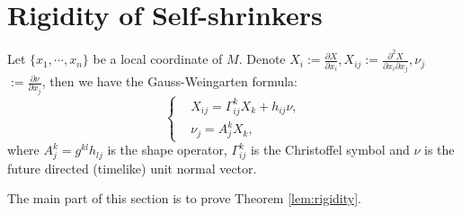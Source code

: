 \documentclass[10pt,a4paper]{amsart}
\newcommand{\pd}[2]{\frac{\partial {#1}}{\partial {#2}}}
\numberwithin{equation}{section}
\begin{document}
\section{Rigidity of Self-shrinkers}\label{sec:rigidity}


Let \(\{x_1,\cdots,x_n\}\) be a local coordinate of \(M\). Denote \(X_i := \pd{X}{x_i}, X_{ij} := \frac{\partial^2 X}{\partial x_i \partial x_j}, \nu_j \) \(:= \pd{\nu}{x_j}\), then we have the Gauss-Weingarten formula: 
\begin{equation}\label{eq:GW-formula}
    \left\{
    \begin{aligned}
    &X_{ij} = \Gamma_{ij}^k X_k + h_{ij}\nu, \\
    &\nu_j = A_j^k X_k, 
    \end{aligned}
    \right.
\end{equation}
where \(A_j^k = g^{kl}h_{lj}\) is the shape operator,   $\Gamma_{ij}^k$ is the Christoffel symbol and \(\nu\) is the future directed (timelike) unit normal vector.  



The main part of this section is to prove Theorem \ref{lem:rigidity}.  
\end{document}
